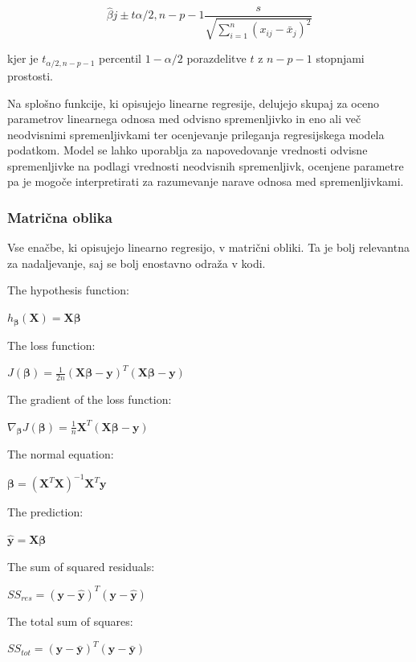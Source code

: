 \documentclass[a4paper,12pt,openright]{book}
\begin{document}
\begin{equation}
\hat{\beta}j \pm t{\alpha/2,n-p-1} \frac{s}{\sqrt{\sum_{i=1}^{n} \left(x_{ij} - \bar{x}_j\right)^2}}
\end{equation}

kjer je $t_{\alpha/2,n-p-1}$ percentil $1-\alpha/2$ porazdelitve $t$ z $n-p-1$ stopnjami prostosti.


Na splošno funkcije, ki opisujejo linearne regresije, delujejo skupaj za oceno parametrov linearnega odnosa med odvisno spremenljivko in eno ali več neodvisnimi spremenljivkami ter ocenjevanje prileganja regresijskega modela podatkom. Model se lahko uporablja za napovedovanje vrednosti odvisne spremenljivke na podlagi vrednosti neodvisnih spremenljivk, ocenjene parametre pa je mogoče interpretirati za razumevanje narave odnosa med spremenljivkami. 


\subsubsection{Matrična oblika}
Vse enačbe, ki opisujejo linearno regresijo, v matrični obliki. Ta je bolj relevantna za nadaljevanje, saj se bolj enostavno odraža v kodi.

The hypothesis function:

$h_{\boldsymbol{\beta}}(\mathbf{X}) = \mathbf{X}\boldsymbol{\beta}$

The loss function:

$J(\boldsymbol{\beta}) = \frac{1}{2n} (\mathbf{X}\boldsymbol{\beta} - \mathbf{y})^T(\mathbf{X}\boldsymbol{\beta} - \mathbf{y})$

The gradient of the loss function:

$\nabla_{\boldsymbol{\beta}} J(\boldsymbol{\beta}) = \frac{1}{n} \mathbf{X}^T(\mathbf{X}\boldsymbol{\beta} - \mathbf{y})$

The normal equation:

$\boldsymbol{\beta} = (\mathbf{X}^T\mathbf{X})^{-1}\mathbf{X}^T\mathbf{y}$

The prediction:

$\hat{\mathbf{y}} = \mathbf{X}\boldsymbol{\beta}$

The sum of squared residuals:

$SS_{res} = (\mathbf{y} - \hat{\mathbf{y}})^T(\mathbf{y} - \hat{\mathbf{y}})$

The total sum of squares:

$SS_{tot} = (\mathbf{y} - \bar{\mathbf{y}})^T(\mathbf{y} - \bar{\mathbf{y}})$
\end{document}
